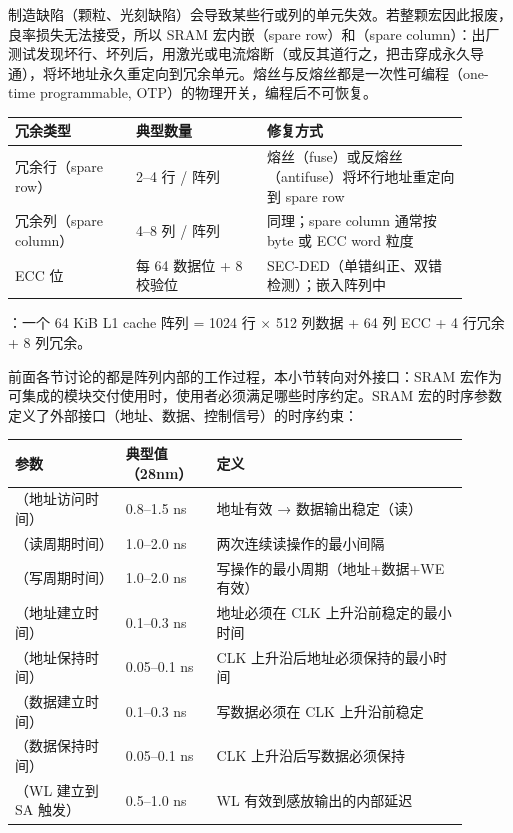 制造缺陷（颗粒、光刻缺陷）会导致某些行或列的单元失效。若整颗宏因此报废，良率损失无法接受，所以 SRAM 宏内嵌（spare row）和（spare column）：出厂测试发现坏行、坏列后，用激光或电流熔断（或反其道行之，把击穿成永久导通），将坏地址永久重定向到冗余单元。熔丝与反熔丝都是一次性可编程（one-time programmable, OTP）的物理开关，编程后不可恢复。

\begin{longtable}{L{0.24\linewidth}L{0.26\linewidth}L{0.40\linewidth}}
\toprule
冗余类型 & 典型数量 & 修复方式 \\
\midrule
冗余行（spare row） & 2--4 行 / 阵列 & 熔丝（fuse）或反熔丝（antifuse）将坏行地址重定向到 spare row \\\tablerowrule
冗余列（spare column） & 4--8 列 / 阵列 & 同理；spare column 通常按 byte 或 ECC word 粒度 \\\tablerowrule
ECC 位 & 每 64 数据位 + 8 校验位 & SEC-DED（单错纠正、双错检测）；嵌入阵列中 \\
\bottomrule
\end{longtable}

：一个 64 KiB L1 cache 阵列 = 1024 行 $\times$ 512 列数据 + 64 列 ECC + 4 行冗余 + 8 列冗余。


前面各节讨论的都是阵列内部的工作过程，本小节转向对外接口：SRAM 宏作为可集成的模块交付使用时，使用者必须满足哪些时序约定。SRAM 宏的时序参数定义了外部接口（地址、数据、控制信号）的时序约束：

\begin{longtable}{L{0.22\linewidth}L{0.18\linewidth}L{0.50\linewidth}}
\toprule
参数 & 典型值（28nm） & 定义 \\
\midrule
{}（地址访问时间） & 0.8--1.5 ns & 地址有效 → 数据输出稳定（读） \\\tablerowrule
{}（读周期时间） & 1.0--2.0 ns & 两次连续读操作的最小间隔 \\\tablerowrule
{}（写周期时间） & 1.0--2.0 ns & 写操作的最小周期（地址+数据+WE 有效） \\\tablerowrule
{}（地址建立时间） & 0.1--0.3 ns & 地址必须在 CLK 上升沿前稳定的最小时间 \\\tablerowrule
{}（地址保持时间） & 0.05--0.1 ns & CLK 上升沿后地址必须保持的最小时间 \\\tablerowrule
{}（数据建立时间） & 0.1--0.3 ns & 写数据必须在 CLK 上升沿前稳定 \\\tablerowrule
{}（数据保持时间） & 0.05--0.1 ns & CLK 上升沿后写数据必须保持 \\\tablerowrule
{}（WL 建立到 SA 触发） & 0.5--1.0 ns & WL 有效到感放输出的内部延迟 \\
\bottomrule
\end{longtable}

